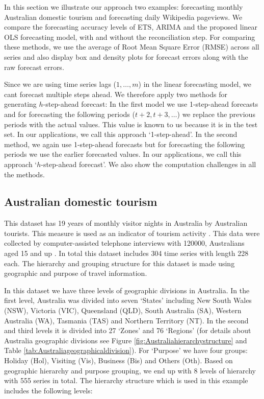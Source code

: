 \documentclass[11pt,a4paper,]{article}
\begin{document}
In this section we illustrate our approach two examples: forecasting monthly Australian domestic tourism and forecasting daily Wikipedia pageviews. We compare the forecasting accuracy levels of ETS, ARIMA and the proposed linear OLS forecasting model, with and without the reconciliation step. For comparing these methods, we use the average of Root Mean Square Error (RMSE) across all series and also display box and density plots for forecast errors along with the raw forecast errors.

Since we are using time series lags (\(1, \dots, m\)) in the linear forecasting model, we cant forecast multiple steps ahead. We therefore apply two methods for generating \(h\)-step-ahead forecast: In the first model we use 1-step-ahead forecasts and for forecasting the following periods (\(t+2,t+3,\dots\)) we replace the previous periods with the actual values. This value is known to us because it is in the test set. In our applications, we call this approach `1-step-ahead'. In the second method, we again use 1-step-ahead forecasts but for forecasting the following periods we use the earlier forecasted values. In our applications, we call this approach `\(h\)-step-ahead forecast'. We also show the computation challenges in all the methods.

\hypertarget{australian-domestic-tourism}{%
\subsection{Australian domestic tourism}\label{australian-domestic-tourism}}

This dataset has 19 years of monthly visitor nights in Australia by Australian tourists. This measure is used as an indicator of tourism activity \autocite{mint2018}. This data were collected by computer-assisted telephone interviews with 120000, Australians aged 15 and up \autocite[Research tourism][]{researchAustralia2005}. In total this dataset includes 304 time series with length 228 each. The hierarchy and grouping structure for this dataset is made using geographic and purpose of travel information.

In this dataset we have three levels of geographic divisions in Australia. In the first level, Australia was divided into seven `States' including New South Wales (NSW), Victoria (VIC), Queensland (QLD), South Australia (SA), Western Australia (WA), Tasmania (TAS) and Northern Territory (NT). In the second and third levels it is divided into 27 `Zones' and 76 `Regions' (for details about Australia geographic divisions see Figure \ref{fig:Australiahierarchystructure} and Table \ref{tab:Australiageographicaldivision}). For `Purpose' we have four groups: Holiday (Hol), Visiting (Vis), Business (Bis) and Others (Oth). Based on geographic hierarchy and purpose grouping, we end up with 8 levels of hierarchy with 555 series in total. The hierarchy structure which is used in this example includes the following levels:
\end{document}
